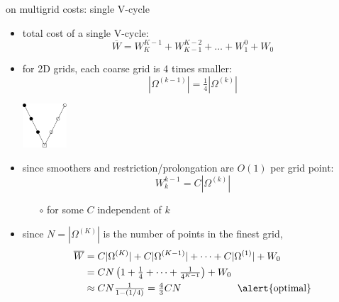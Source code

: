 \documentclass[10pt,
               svgnames,
               hyperref={colorlinks,citecolor=DeepPink4,linkcolor=FireBrick,urlcolor=Maroon},
               usepdftitle=false]{beamer}
\begin{document}
\begin{frame}{on multigrid costs: single V-cycle}
\begin{itemize}
\item total cost of a single V-cycle:
    $$\overline{W} = W_K^{K-1} + W_{K-1}^{K-2} + \dots + W_1^0 + W_0$$
\item for 2D grids, each coarse grid is 4 times smaller:
    $$|\Omega^{(k-1)}| = \tfrac{1}{4} |\Omega^{(k)}|$$

\vspace{-28mm}
\hfill \includegraphics[width=0.13\textwidth]{images/vcycle.png}

\vspace{9mm}
\item since smoothers and restriction/prolongation are $O(1)$ per grid point:
    $$W_k^{k-1} = C |\Omega^{(k)}|$$

    \begin{itemize}
    \item[$\circ$] for some $C$ independent of $k$
    \end{itemize}
\item<2> since $N=|\Omega^{(K)}|$ is the number of points in the finest grid,
\begin{align*}
\overline{W} &= C |\Omega^{(K)}| + C |\Omega^{(K-1)}| + \dots + C |\Omega^{(1)}| + W_0 \\
    &= C N \left(1 + \tfrac{1}{4} + \dots + \tfrac{1}{4^{K-1}}\right) + W_0 \\
    &\approx C N \tfrac{1}{1-(1/4)} = \tfrac{4}{3} C N \hspace{20mm} \text{\alert{optimal}}
\end{align*}
\end{itemize}
\end{frame}
\end{document}
